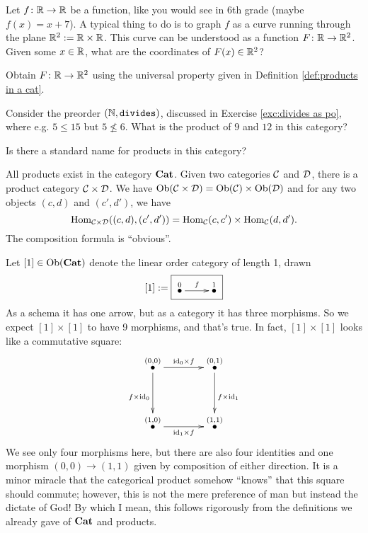 \documentclass[CT4S-EN-RU]{subfiles}
\begin{document}
\begin{exerciseRUS}
\end{exerciseRUS}

\begin{exerciseENG}
Let $f\colon{\mathbb R}\rightarrow{\mathbb R}$ be a function, like you would see in 6th grade (maybe $f(x)=x+7$). A typical thing to do is to graph $f$ as a curve running through the plane ${\mathbb R}^2:={\mathbb R}\times{\mathbb R}$. This curve can be understood as a function $F\colon{\mathbb R}\rightarrow{\mathbb R}^2$.
\sexc Given some $x\in{\mathbb R}$, what are the coordinates of $F(x)\in{\mathbb R}^2$? 
\item Obtain $F\colon{\mathbb R}\rightarrow{\mathbb R}^2$ using the universal property given in Definition \ref{def:products in a cat}. 
\endsexc
\end{exerciseENG}

\begin{exerciseRUS}
\end{exerciseRUS}

\begin{exerciseENG}
Consider the preorder $({\mathbb N},{\tt divides})$, discussed in Exercise \ref{exc:divides as po}, where e.g. $5\leq 15$ but $5\not\leq 6$. \sexc What is the product of $9$ and $12$ in this category?
\item Is there a standard name for products in this category?
\endsexc
\end{exerciseENG}

\begin{exerciseRUS}
\end{exerciseRUS}

\begin{exampleENG}\label{ex:[1]x[1]}
All products exist in the category ${\mathbf{Cat}}$. Given two categories $\mathcal{C}$ and $\mathcal{D}$, there is a product category $\mathcal{C}\times\mathcal{D}$. We have $\textnormal{Ob}(\mathcal{C}\times\mathcal{D})=\textnormal{Ob}(\mathcal{C})\times\textnormal{Ob}(\mathcal{D})$ and for any two objects $(c,d)$ and $(c',d')$, we have $$\textnormal{Hom}_{\mathcal{C}\times\mathcal{D}}((c,d),(c',d'))=\textnormal{Hom}_\mathcal{C}(c,c')\times\textnormal{Hom}_\mathcal{C}(d,d').$$ The composition formula is “obvious”.

Let $[1]\in\textnormal{Ob}({\mathbf{Cat}})$ denote the linear order category of length 1, drawn $$[1]:=\fbox{\xymatrix{\LMO{0}\ar[r]^f&\LMO{1}}}$$ As a schema it has one arrow, but as a category it has three morphisms. So we expect $[1]\times[1]$ to have 9 morphisms, and that's true. In fact, $[1]\times[1]$ looks like a commutative square:
\begin{align}\label{dia:comm square}
\xymatrix@=40pt{
\LMO{(0,0)}\ar[r]^{\id_0\times f}\ar[d]_{f\times\id_0}&\LMO{(0,1)}\ar[d]^{f\times\id_1}\\
\LMO{(1,0)}\ar[r]_{\id_1\times f}&\LMO{(1,1)}}
\end{align}
We see only four morphisms here, but there are also four identities and one morphism $(0,0)\to(1,1)$ given by composition of either direction. It is a minor miracle that the categorical product somehow “knows” that this square should commute; however, this is not the mere preference of man but instead the dictate of God! By which I mean, this follows rigorously from the definitions we already gave of ${\mathbf{Cat}}$ and products.
\end{exampleENG}
\end{document}
